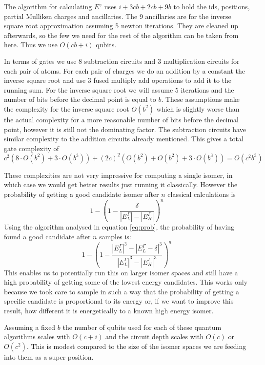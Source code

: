 The algorithm for calculating $E^\gamma$ uses $i+3cb+2cb+9b$ to hold the ids, positions, partial Mulliken charges and ancillaries. The 9 ancillaries are for the inverse square root approximation assuming 5 newton iterations. They are cleaned up afterwards, so the few we need for the rest of the algorithm can be taken from here. Thus we use $O(cb+i)$ qubits. 

In terms of gates we use 8 subtraction circuits and 3 multiplication circuits for each pair of atoms. For each pair of charges we do an addition by a constant the inverse square root and use 3 fused multiply add operations to add it to the running sum. For the inverse square root we will assume 5 iterations and the number of bits before the decimal point is equal to $b$. These assumptions make the complexity for the inverse square root $O(b^2)$ which is slightly worse than the actual complexity for a more reasonable number of bits before the decimal point, however it is still not the dominating factor. The subtraction circuits have similar complexity to the addition circuits already mentioned. This gives a total gate complexity of $c^2(8\cdot O(b^2)+3\cdot O(b^3)) + (2c)^2(O(b^2)+O(b^2)+3\cdot O(b^3))=O(c^2b^3)$

These complexities are not very impressive for computing a single isomer, in which case we would get better results just running it classically. However the probability of getting a good candidate isomer after $n$ classical calculations is 
\begin{equation}
    1-\left(1-\frac{\delta}{|{E^\Gamma_L}|-|{E^\Gamma_H}|}\right)^n
\end{equation}
Using the algorithm analysed in equation \ref{eq:prob}, the probability of having found a good candidate after $n$ samples is:
\begin{equation}
1-\left(1-\frac{|{E^\Gamma_L}|^3-|{E^\Gamma_L-\delta}|^3}{|{E^\Gamma_L}|^3-|{E^\Gamma_H}|^3}\right)^n
\end{equation}
This enables us to potentially run this on larger isomer spaces and still have a high probability of getting some of the lowest energy candidates. This works only because we took care to sample in such a way that the probability of getting a specific candidate is proportional to its energy or, if we want to improve this result, how different it is energetically to a known high energy isomer. 

Assuming a fixed $b$ the number of qubits used for each of these quantum algorithms scales with $O(c+i)$ and the circuit depth scales with $O(c)$ or $O(c^2)$. This is modest compared to the size of the isomer spaces we are feeding into them as a super position.

